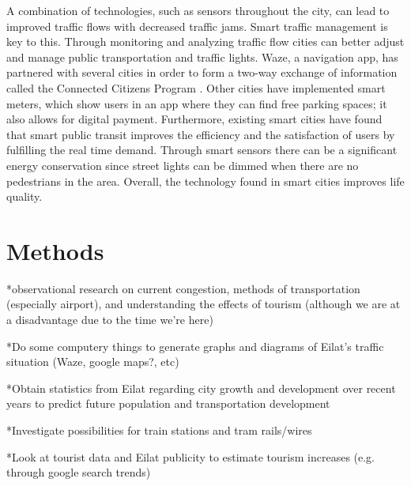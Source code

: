 \documentclass[12pt]{article}                         %
\begin{document}
A combination of technologies, such as sensors throughout the city, can lead to improved traffic flows with decreased traffic jams. Smart traffic management is key to this. Through monitoring and analyzing traffic flow cities can better adjust and manage public transportation and traffic lights. Waze, a navigation app, has partnered with several cities in order to form a two-way exchange of information called the Connected Citizens Program \cite{Stern2016WazeMobility}. Other cities have implemented smart meters, which show users in an app where they can find free parking spaces; it also allows for digital payment. Furthermore, existing smart cities have found that smart public transit improves the efficiency and the satisfaction of users by fulfilling the real time demand. Through smart sensors there can be a significant energy conservation since street lights can be dimmed when there are no pedestrians in the area. Overall, the technology found in smart cities improves life quality. 

\newpage
\section{Methods}

*observational research on current congestion, methods of transportation (especially airport), and understanding the effects of tourism (although we are at a disadvantage due to the time we're here)

*Do some computery things to generate graphs and diagrams of Eilat's traffic situation (Waze, google maps?, etc)

*Obtain statistics from Eilat regarding city growth and development over recent years to predict future population and transportation development

*Investigate possibilities for train stations and tram rails/wires

*Look at tourist data and Eilat publicity to estimate tourism increases (e.g. through google search trends)

\newpage


\end{document}

